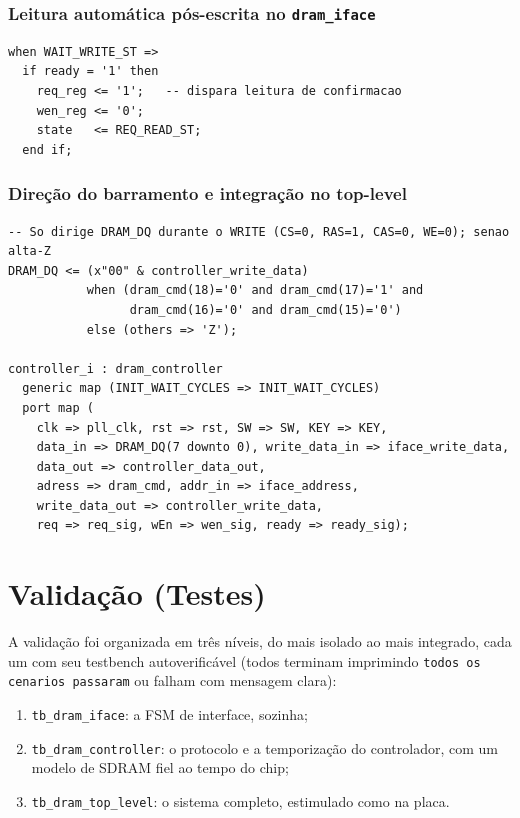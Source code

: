 \documentclass[12pt,a4paper]{article}
\begin{document}
\subsubsection{Leitura automática pós-escrita no \texttt{dram\_iface}}
\begin{lstlisting}[caption={Ao fim da escrita, a propria interface dispara um READ de confirmacao (dram\_iface.vhd).}]
when WAIT_WRITE_ST =>
  if ready = '1' then
    req_reg <= '1';   -- dispara leitura de confirmacao
    wen_reg <= '0';
    state   <= REQ_READ_ST;
  end if;
\end{lstlisting}

\subsubsection{Direção do barramento e integração no top-level}
\begin{lstlisting}[caption={O top-level so dirige DRAM\_DQ no comando WRITE e instancia o controlador (dram\_top\_level.vhd).}]
-- So dirige DRAM_DQ durante o WRITE (CS=0, RAS=1, CAS=0, WE=0); senao alta-Z
DRAM_DQ <= (x"00" & controller_write_data)
           when (dram_cmd(18)='0' and dram_cmd(17)='1' and
                 dram_cmd(16)='0' and dram_cmd(15)='0')
           else (others => 'Z');

controller_i : dram_controller
  generic map (INIT_WAIT_CYCLES => INIT_WAIT_CYCLES)
  port map (
    clk => pll_clk, rst => rst, SW => SW, KEY => KEY,
    data_in => DRAM_DQ(7 downto 0), write_data_in => iface_write_data,
    data_out => controller_data_out,
    adress => dram_cmd, addr_in => iface_address,
    write_data_out => controller_write_data,
    req => req_sig, wEn => wen_sig, ready => ready_sig);
\end{lstlisting}

\section{Validação (Testes)}
A validação foi organizada em três níveis, do mais isolado ao mais integrado, cada
um com seu testbench autoverificável (todos terminam imprimindo
\texttt{todos os cenarios passaram} ou falham com mensagem clara):
\begin{enumerate}
  \item \texttt{tb\_dram\_iface}: a FSM de interface, sozinha;
  \item \texttt{tb\_dram\_controller}: o protocolo e a temporização do controlador,
        com um modelo de SDRAM fiel ao tempo do chip;
  \item \texttt{tb\_dram\_top\_level}: o sistema completo, estimulado como na placa.
\end{enumerate}
\end{document}
